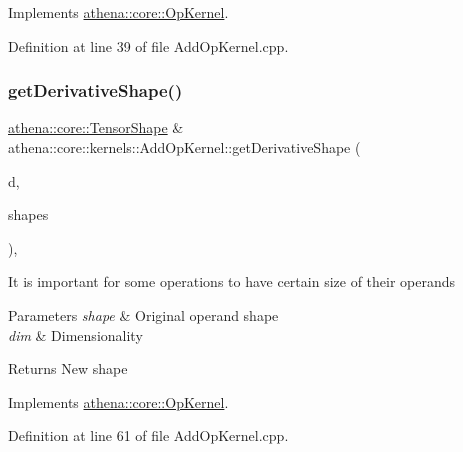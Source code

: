 Implements \mbox{\hyperlink{classathena_1_1core_1_1_op_kernel_ad500db1afc5a7c10acff8ecb8f1bee4d}{athena\+::core\+::\+Op\+Kernel}}.



Definition at line 39 of file Add\+Op\+Kernel.\+cpp.

\mbox{\label{classathena_1_1core_1_1kernels_1_1_add_op_kernel_a240d13047b8fd7676bf1f9d2bc94298f}} 
\subsubsection{\texorpdfstring{get\+Derivative\+Shape()}{getDerivativeShape()}}
{\footnotesize\ttfamily \mbox{\hyperlink{classathena_1_1core_1_1_tensor_shape}{athena\+::core\+::\+Tensor\+Shape}} \& athena\+::core\+::kernels\+::\+Add\+Op\+Kernel\+::get\+Derivative\+Shape (\begin{DoxyParamCaption}\item[{int}]{d,  }\item[{std\+::vector$<$ \mbox{\hyperlink{classathena_1_1core_1_1_tensor_shape}{athena\+::core\+::\+Tensor\+Shape}} $>$ \&}]{shapes }\end{DoxyParamCaption})\hspace{0.3cm}{\ttfamily [override]}, {\ttfamily [virtual]}}

It is important for some operations to have certain size of their operands 
\begin{DoxyParams}{Parameters}
{\em shape} & Original operand shape \\
\hline
{\em dim} & Dimensionality \\
\hline
\end{DoxyParams}
\begin{DoxyReturn}{Returns}
New shape 
\end{DoxyReturn}


Implements \mbox{\hyperlink{classathena_1_1core_1_1_op_kernel_ad95af6dd184ce7ee9182ec7ca54b6c4d}{athena\+::core\+::\+Op\+Kernel}}.



Definition at line 61 of file Add\+Op\+Kernel.\+cpp.

\mbox{\label{classathena_1_1core_1_1kernels_1_1_add_op_kernel_a296a0c69a7b906037324cce2b64827e1}} 
